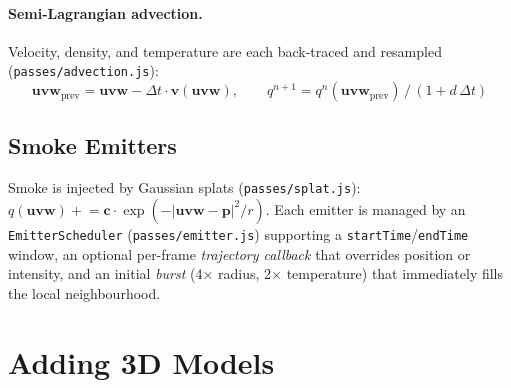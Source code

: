 \documentclass[a4paper, 12pt]{article}
\begin{document}
\paragraph{Semi-Lagrangian advection.}
Velocity, density, and temperature are each back-traced and resampled
(\texttt{passes/advection.js}):
\[
  \mathbf{uvw}_{\text{prev}} = \mathbf{uvw} - \Delta t\cdot\mathbf{v}(\mathbf{uvw}),
  \qquad
  q^{n+1} = q^n(\mathbf{uvw}_{\text{prev}})\,/\,(1 + d\,\Delta t)
\]

\subsection{Smoke Emitters}

Smoke is injected by Gaussian splats (\texttt{passes/splat.js}):
$q(\mathbf{uvw}) \mathrel{+}= \mathbf{c}\cdot
\exp(-|\mathbf{uvw}-\mathbf{p}|^2/r)$.
Each emitter is managed by an \texttt{EmitterScheduler}
(\texttt{passes/emitter.js}) supporting a \texttt{startTime}/\texttt{endTime}
window, an optional per-frame \emph{trajectory callback} that overrides
position or intensity, and an initial \emph{burst} (4$\times$ radius,
2$\times$ temperature) that immediately fills the local neighbourhood.

\section{Adding 3D Models}



\end{document}
